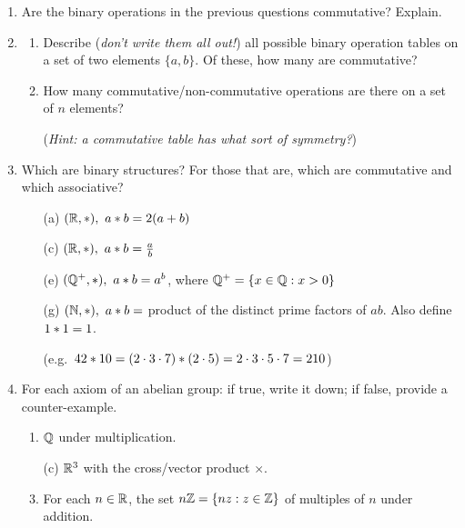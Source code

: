 \begin{exercises}
\begin{enumerate}
	\item Are the binary operations in the previous questions commutative? Explain.


	\item\begin{enumerate}\itemsep0pt
	  \item Describe (\emph{don't write them all out!}) all possible binary operation tables on a set of two elements $\{a,b\}$. Of these, how many are commutative?
	  \item How many commutative/non-commutative operations are there on a set of \emph{$n$} elements?\par
	  (\emph{Hint: a commutative table has what sort of symmetry?})
	\end{enumerate}
	
  
  \item Which are binary structures? For those that are, which are commutative and which associative?\vspace{-6pt}
  \begin{enumerate}\itemsep0pt
    \item[(a)]  $(\mathbb{R},*),\ a\mathbin{\ast} b=2(a+b)$
    \item[(c)]  $(\mathbb{R},*),\ a\mathbin{\ast} b=\frac ab$\setcounter{enumii}{4}
    \item[(e)]  $(\mathbb{Q}^+,*),\ a\mathbin{\ast}  b=a^b$,  where $\mathbb{Q}^+=\{x\in\mathbb{Q}:x>0\}$
    \item[(g)] $(\mathbb{N},*),\ a\mathbin{\ast} b=$ product of the distinct prime factors of $ab$. Also define $1\mathbin{\ast} 1=1$.\par
    (e.g.~$42\mathbin{\ast} 10=(2\cdot 3\cdot 7)\mathbin{\ast} (2\cdot 5)=2\cdot 3\cdot 5\cdot 7=210$) 
  \end{enumerate}
  

  \goodbreak
  
	\item For each axiom of an abelian group: if true, write it down; if false, provide a counter-example.\vspace{-6pt}
	\begin{enumerate}\itemsep2pt
	  \item {} $\mathbb{Q}$ under multiplication.\setcounter{enumii}{2}
	  \item[(c)]  $\mathbb{R}^3$ with the cross/vector product $\times$.\setcounter{enumii}{4}
	  \item\label{exs:nzgroup} For each $n\in\mathbb{R}$, the set $n\mathbb{Z}=\{nz:z\in\mathbb{Z}\}$ of multiples of $n$ under addition.
  \end{enumerate}
  

\end{enumerate}
\end{exercises}

